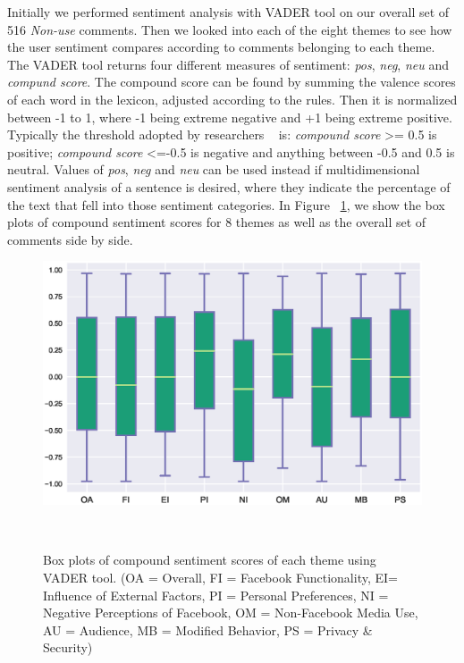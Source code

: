 Initially we performed sentiment analysis with VADER tool on our overall set of 516 \textit{Non-use} comments. Then we looked into each of the eight themes to see how the user sentiment compares according to comments belonging to each theme. The VADER tool returns four different measures of sentiment: \textit{pos}, \textit{neg}, \textit{neu} and \textit{compund score}. The compound score can be found by summing the valence scores of each word in the lexicon, adjusted according to the rules. Then it is normalized between -1 to 1, where -1 being extreme negative and +1 being extreme positive. Typically the threshold adopted by researchers ~\cite{hutto2014vader} is: \textit{compound score} >= 0.5 is positive; \textit{compound score} <=-0.5 is negative and anything between -0.5 and 0.5 is neutral. Values of \textit{pos}, \textit{neg} and \textit{neu} can be used instead if multidimensional sentiment analysis of a sentence is desired, where they indicate the percentage of the text that fell into those sentiment categories. In Figure ~\ref{fig:figure6}, we show the box plots of compound sentiment scores for 8 themes as well as the overall set of comments side by side.  


\begin{figure}[t!]
  \centering
  \includegraphics[width=1.0\columnwidth]{figures/fig6.eps}
  \caption{Box plots of compound sentiment scores of each theme using VADER tool. (OA = Overall, FI = Facebook Functionality, EI= Influence of External Factors, PI = Personal Preferences, NI = Negative Perceptions of Facebook, OM = Non-Facebook Media Use, AU = Audience, MB = Modified Behavior, PS = Privacy \& Security)}~\label{fig:figure6}
\end{figure}

